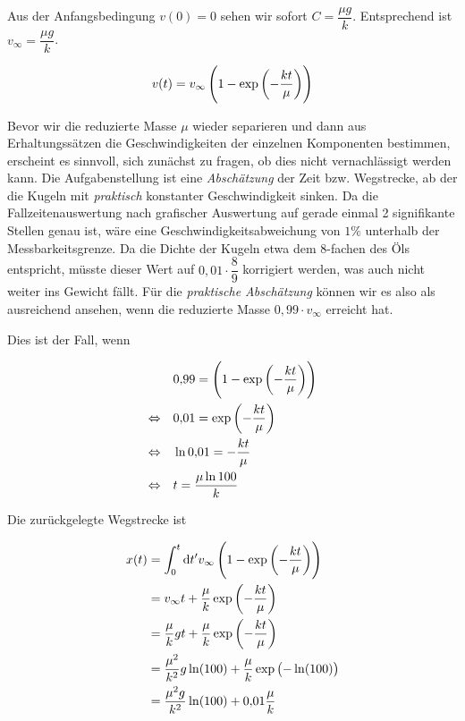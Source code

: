 \documentclass[a4paper,german,12pt,smallheadings]{scrartcl}
\begin{document}
Aus der Anfangsbedingung $v(0) = 0$ sehen wir sofort $C = \dfrac{\mu g}{k}$.
Entsprechend ist $v_\infty = \dfrac{\mu g}{k}$.

\begin{equation}
  v(t) = v_\infty \del{1 - \exp\del{-\frac{k t}{\mu}}}
\end{equation}


Bevor wir die reduzierte Masse $\mu$ wieder separieren und dann aus
Erhaltungssätzen die Geschwindigkeiten der einzelnen Komponenten bestimmen,
erscheint es sinnvoll, sich zunächst zu fragen, ob dies nicht vernachlässigt
werden kann. Die Aufgabenstellung ist eine \textit{Abschätzung} der Zeit bzw.
Wegstrecke, ab der die Kugeln mit \textit{praktisch} konstanter Geschwindigkeit
sinken. Da die Fallzeitenauswertung nach grafischer Auswertung auf gerade
einmal 2 signifikante Stellen genau ist, wäre eine Geschwindigkeitsabweichung
von $1 \%$ unterhalb der Messbarkeitsgrenze. Da die Dichte der Kugeln etwa dem
8-fachen des Öls entspricht, müsste dieser Wert auf $0{,}01 \cdot \dfrac{8}{9}$
korrigiert werden, was auch nicht weiter ins Gewicht fällt. Für die
\textit{praktische Abschätzung} können wir es also als ausreichend ansehen,
wenn die reduzierte Masse $0{,}99 \cdot v_\infty$ erreicht hat.

Dies ist der Fall, wenn

\begin{align*}
  &0{,}99 = \del{1 - \exp\del{-\frac{k t}{\mu}}} \\
  \Leftrightarrow \quad &
  0{,}01 = \exp\del{-\frac{k t}{\mu}} \\
  \Leftrightarrow \quad &
  \ln{0{,}01} = -\frac{k t}{\mu} \\
  \Leftrightarrow \quad &
  t = \frac{\mu \ln{100}}{k}\\
\end{align*}

Die zurückgelegte Wegstrecke ist

\begin{align}
  x(t) &= \int_0^t \dif t' v_{\infty} \del{1 - \exp\del{-\frac{k t}{\mu}}} \\
  &= v_\infty t + \frac{\mu}{k} \exp\del{-\frac{k t}{\mu}} \\
  &= \frac{\mu}{k} g t + \frac{\mu}{k} \exp\del{-\frac{k t}{\mu}} \\
  &= \frac{\mu^2}{k^2} g \ln(100) + \frac{\mu}{k} \exp\del{-\ln(100)} \\
  &= \frac{\mu^2g}{k^2} \ln(100) + 0{,}01 \frac{\mu}{k}
\end{align}
\end{document}
